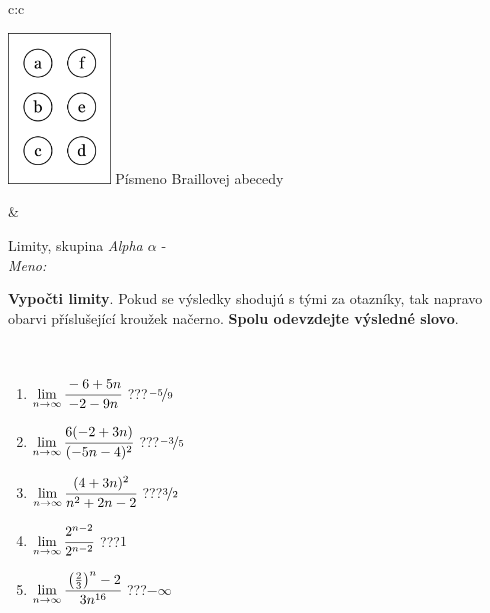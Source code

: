 \documentclass[10pt]{report}
\begin{document}
\begin{tabular}{c:c}
\begin{minipage}[c][104.5mm][t]{0.5\linewidth}
\begin{center}
\begin{minipage}{0.20\linewidth}
\begin{center}
\includegraphics[height=40mm]{../images/braille.png}
{\small Písmeno Braillovej abecedy}
\end{center}
\end{minipage}
\end{center}
\end{minipage}
&
\begin{minipage}[c][104.5mm][t]{0.5\linewidth}
\begin{center}
\vspace{7mm}
{\huge Limity, skupina \textit{Alpha $\alpha$} -}\\[5mm]
\textit{Meno:}\phantom{xxxxxxxxxxxxxxxxxxxxxxxxxxxxxxxxxxxxxxxxxxxxxxxxxxxxxxxxxxxxxxxxx}\\[5mm]
\begin{minipage}{0.95\linewidth}
\begin{center}
\textbf{Vypočti limity}. Pokud se výsledky shodujú s tými za otazníky, tak napravo\\obarvi příslušející kroužek načerno. \textbf{Spolu odevzdejte výsledné slovo}.
\end{center}
\end{minipage}
\\[1mm]
\begin{minipage}{0.79\linewidth}
\begin{center}
\begin{varwidth}{\linewidth}
\begin{enumerate}
\normalsize
\item $\lim\limits_{n\to\infty}\cfrac{-6+5n}{-2-9n}$\quad \dotfill\; ???\;\dotfill \quad $\nicefrac{-5}{9}$
\item $\lim\limits_{n\to\infty}\cfrac{6(-2+3n)}{(-5n-4)^2}$\quad \dotfill\; ???\;\dotfill \quad $\nicefrac{-3}{5}$
\item $\lim\limits_{n\to\infty}\cfrac{(4+3n)^2}{n^2+2n-2}$\quad \dotfill\; ???\;\dotfill \quad $\nicefrac{3}{2}$
\item $\lim\limits_{n\to\infty}\cfrac{2^{n-2}}{2^{n-2}}$\quad \dotfill\; ???\;\dotfill \quad $1$
\item $\lim\limits_{n\to\infty}\cfrac{\left(\frac{2}{3}\right)^n -2}{3n^{16}}$\quad \dotfill\; ???\;\dotfill \quad $-\infty$

\end{enumerate}
\end{varwidth}
\end{center}
\end{minipage}
\end{center}
\end{minipage}
\end{tabular}
\end{document}
